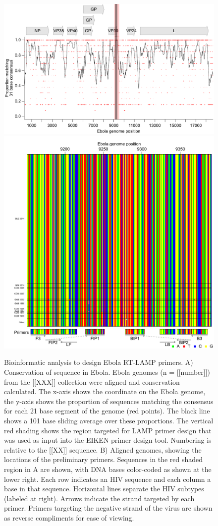 \documentclass[../sherrill-Mix_thesis.tex]{subfiles}
\begin{document}
\begin{figure}
	\centering
	\includegraphics[width=.6\textwidth]{ebolaConsensus.pdf} %
	\includegraphics[width=.6\textwidth]{loop_bases.pdf} %
	\caption[Bioinformatic analysis to design Ebola RT-LAMP primers]{Bioinformatic analysis to design Ebola RT-LAMP primers. A) Conservation of sequence in Ebola. Ebola genomes (n = [[number]]) from the [[XXX]] collection were aligned and conservation calculated. The x-axis shows the coordinate on the Ebola genome, the y-axis shows the proportion of sequences matching the consensus for each 21 base segment of the genome (red points). The black line shows a 101 base sliding average over these proportions. The vertical red shading shows the region targeted for LAMP primer design that was used as input into the EIKEN primer design tool. Numbering is relative to the [[XX]] sequence. B) Aligned genomes, showing the locations of the preliminary primers. Sequences in the red shaded region in A are shown, with DNA bases color-coded as shown at the lower right. Each row indicates an HIV sequence and each column a base in that sequence. Horizontal lines separate the HIV subtypes (labeled at right). Arrows indicate the strand targeted by each primer. Primers targeting the negative strand of the virus are shown as reverse compliments for ease of viewing.}
	\label{figEbolaConsensus}
\end{figure}
\end{document}
